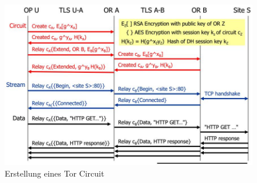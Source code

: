 \begin{figure}[h]
\centering
\includegraphics[width=0.7\linewidth]{images/tor_circuit_construction}
\caption{Erstellung eines Tor Circuit}
\label{fig:torcircuitconstruction}
\end{figure}


